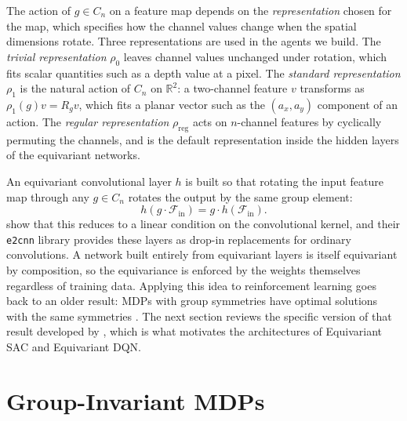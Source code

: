 \documentclass[letterpaper]{article}
\begin{document}
The action of $g \in C_n$ on a feature map depends on the \emph{representation} chosen for the map, which specifies how the channel values change when the spatial dimensions rotate. Three representations are used in the agents we build. The \emph{trivial representation} $\rho_0$ leaves channel values unchanged under rotation, which fits scalar quantities such as a depth value at a pixel. The \emph{standard representation} $\rho_1$ is the natural action of $C_n$ on $\mathbb{R}^2$: a two-channel feature $v$ transforms as $\rho_1(g) v = R_g v$, which fits a planar vector such as the $(a_x, a_y)$ component of an action. The \emph{regular representation} $\rho_\text{reg}$ acts on $n$-channel features by cyclically permuting the channels, and is the default representation inside the hidden layers of the equivariant networks.

An equivariant convolutional layer $h$ is built so that rotating the input feature map through any $g \in C_n$ rotates the output by the same group element:
\begin{equation}
h(g \cdot \mathcal{F}_\text{in}) = g \cdot h(\mathcal{F}_\text{in}).
\end{equation}
\citet{weiler2019e2cnn} show that this reduces to a linear condition on the convolutional kernel, and their \texttt{e2cnn} library provides these layers as drop-in replacements for ordinary convolutions. A network built entirely from equivariant layers is itself equivariant by composition, so the equivariance is enforced by the weights themselves regardless of training data. Applying this idea to reinforcement learning goes back to an older result: MDPs with group symmetries have optimal solutions with the same symmetries \citep{ravindran2001symmetries,vanderpol2020mdp}. The next section reviews the specific version of that result developed by \citet{wang2022so2}, which is what motivates the architectures of Equivariant SAC and Equivariant DQN.


\section{Group-Invariant MDPs}
\end{document}
